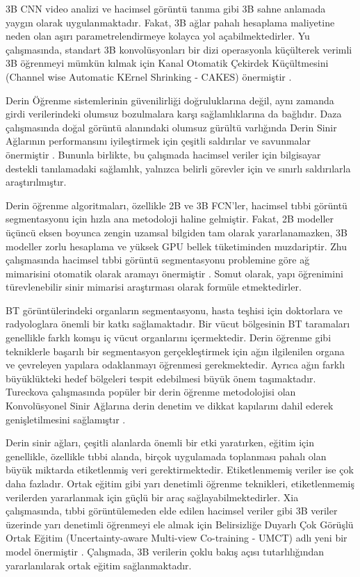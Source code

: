3B CNN video analizi ve hacimsel görüntü tanıma gibi 3B sahne anlamada yaygın olarak uygulanmaktadır. Fakat, 3B ağlar pahalı hesaplama maliyetine neden olan aşırı parametrelendirmeye kolayca yol açabilmektedirler. Yu çalışmasında, standart 3B konvolüsyonları bir dizi operasyonla küçülterek verimli 3B öğrenmeyi mümkün kılmak için Kanal Otomatik Çekirdek Küçültmesini (Channel wise Automatic KErnel Shrinking - CAKES) önermiştir \cite{yu2020cakes}.

Derin Öğrenme sistemlerinin güvenilirliği doğruluklarına değil, aynı zamanda girdi verilerindeki olumsuz bozulmalara karşı sağlamlıklarına da bağlıdır. Daza çalışmasında doğal görüntü alanındaki olumsuz gürültü varlığında Derin Sinir Ağlarının performansını iyileştirmek için çeşitli saldırılar ve savunmalar önermiştir \cite{daza2021towards}. Bununla birlikte, bu çalışmada hacimsel veriler için bilgisayar destekli tanılamadaki sağlamlık, yalnızca belirli görevler için ve sınırlı saldırılarla araştırılmıştır.

Derin öğrenme algoritmaları, özellikle 2B ve 3B FCN'ler, hacimsel tıbbi görüntü segmentasyonu için hızla ana metodoloji haline gelmiştir. Fakat, 2B modeller üçüncü eksen boyunca zengin uzamsal bilgiden tam olarak yararlanamazken, 3B modeller zorlu hesaplama ve yüksek GPU bellek tüketiminden muzdariptir. Zhu çalışmasında hacimsel tıbbi görüntü segmentasyonu problemine göre ağ mimarisini otomatik olarak aramayı önermiştir \cite{zhu2019v}. Somut olarak, yapı öğrenimini türevlenebilir sinir mimarisi araştırması olarak formüle etmektedirler. 

BT görüntülerindeki organların segmentasyonu, hasta teşhisi için doktorlara ve radyologlara önemli bir katkı sağlamaktadır. Bir vücut bölgesinin BT taramaları genellikle farklı komşu iç vücut organlarını içermektedir. Derin öğrenme gibi tekniklerle başarılı bir segmentasyon gerçekleştirmek için ağın ilgilenilen organa ve çevreleyen yapılara odaklanmayı öğrenmesi gerekmektedir. Ayrıca ağın farklı büyüklükteki hedef bölgeleri tespit edebilmesi büyük önem taşımaktadır. Tureckova çalışmasında popüler bir derin öğrenme metodolojisi olan Konvolüsyonel Sinir Ağlarına derin denetim ve dikkat kapılarını dahil ederek genişletilmesini sağlamıştır \cite{tureckova2020improving}.

Derin sinir ağları, çeşitli alanlarda önemli bir etki yaratırken, eğitim için genellikle, özellikle tıbbi alanda, birçok uygulamada toplanması pahalı olan büyük miktarda etiketlenmiş veri gerektirmektedir.  Etiketlenmemiş veriler ise çok daha fazladır. Ortak eğitim gibi yarı denetimli öğrenme teknikleri, etiketlenmemiş verilerden yararlanmak için güçlü bir araç sağlayabilmektedirler. Xia çalışmasında, tıbbi görüntülemeden elde edilen hacimsel veriler gibi 3B veriler üzerinde yarı denetimli öğrenmeyi ele almak için Belirsizliğe Duyarlı Çok Görüşlü Ortak Eğitim (Uncertainty-aware Multi-view Co-training - UMCT) adlı yeni bir model önermiştir \cite{xia20203d}. Çalışmada, 3B verilerin çoklu bakış açısı tutarlılığından yararlanılarak ortak eğitim sağlanmaktadır. 

